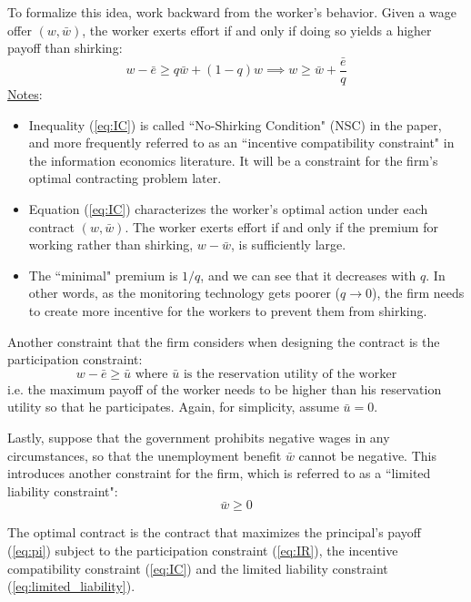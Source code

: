 \documentclass[12pt]{article}
\begin{document}
To formalize this idea, work backward from the worker's behavior. Given a wage offer $(w, \bar{w})$, the worker exerts effort if and only if doing so yields a higher payoff than shirking:
\begin{equation} \label{eq:IC}
	w - \bar{e} \geq q \bar{w} + (1-q) w \implies w \geq \bar{w} + \frac{\bar{e}}{q} 
\end{equation}
\underline{Notes}:
\begin{itemize}
	\item Inequality (\ref{eq:IC}) is called ``No-Shirking Condition" (NSC) in the paper, and more frequently referred to as an ``incentive compatibility constraint" in the information economics literature. It will be a constraint for the firm's optimal contracting problem later.
		\item Equation (\ref{eq:IC}) characterizes the worker's optimal action under each contract $(w, \bar{w})$. The worker exerts effort if and only if the premium for working rather than shirking, $w - \bar{w}$, is sufficiently large.
	\item The ``minimal" premium is $1/q$, and we can see that it decreases with $q$. In other words, as the monitoring technology gets poorer ($q \to 0$), the firm needs to create more incentive for the workers to prevent them from shirking. 
\end{itemize}
	 Another constraint that the firm considers when designing the contract is the participation constraint:
  \begin{equation} \label{eq:IR}
  	w - \bar{e} \geq \bar{u} \text{ where } \bar{u} \text{ is the reservation utility of the worker}
  \end{equation}
i.e. the maximum payoff of the worker needs to be higher than his reservation utility so that he participates. Again, for simplicity, assume $\bar{u} = 0$.

Lastly, suppose that the government prohibits negative wages in any circumstances, so that the unemployment benefit $\bar{w}$ cannot be negative. This introduces another constraint for the firm, which is referred to as a ``limited liability constraint":
\begin{equation} \label{eq:limited_liability}
	\bar{w} \geq 0
\end{equation}

 The optimal contract is the contract that maximizes the principal's payoff (\ref{eq:pi}) subject to the participation constraint (\ref{eq:IR}), the incentive compatibility constraint (\ref{eq:IC}) and the limited liability constraint (\ref{eq:limited_liability}).
 
\end{document}
